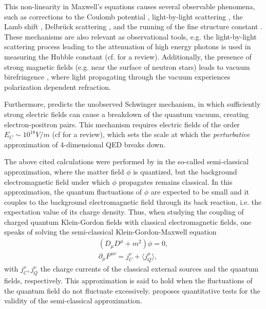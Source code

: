 This non-linearity in Maxwell's equations causes several observable phenomena, such as corrections to the Coulomb potential \cite{Uehl1935, PhysRev.101.843},  light-by-light scattering \cite{Heis1936, ATLAS:2016pab}, 
the Lamb shift \cite{Lamb1947}, Delbrück scattering \cite{Jarl1973, ATLAS:2016pab}, and the running of the fine structure constant \cite{2017485}. These mechanisms are also relevant as observational tools, e.g. the light-by-light scattering process leading to the attenuation of high energy photons is used in measuring the Hubble constant \cite{Domí2019} (cf. \cite{Fran2021} for a review). Additionally, the presence of strong magnetic fields (e.g. near the surface of neutron stars) leads to vacuum birefringence \cite{10.1093/mnras/stw2798}, where light propagating through the vacuum experiences polarization dependent refraction. 

Furthermore, \cite{Schw51} predicts the unobserved Schwinger mechanism, in which sufficiently strong electric fields can cause a breakdown of the quantum vacuum, creating electron-positron pairs.
This mechanism requires electric fields of the order $E_C \sim 10^{18}V/m$ (cf \cite{Dunne2009} for a review), which sets the scale at which the \textit{perturbative} approximation of 4-dimensional QED breaks down. 

The above cited calculations were performed by in the so-called semi-classical approximation, where the matter field $\phi$ is quantized, but the background electromagnetic field under which $\phi$ propagates remains classical. In this approximation, the quantum fluctuations of $\phi$ are expected to be small and it couples to the background electromagnetic field through its back reaction, i.e. the expectation value of its charge density. Thus, when studying the coupling of charged quantum Klein-Gordon fields with classical electromagnetic fields, one speaks of solving the semi-classical Klein-Gordon-Maxwell equation 
\begin{subequations}
\begin{align}
    (D_\mu D^\mu + m^2 ) \phi = 0, \\
    \partial_\mu F^{\mu \nu} = j^\nu_C + \langle j^\mu_Q \rangle,
    \label{eq:maxwell}
\end{align}
\end{subequations}
with $j^\nu_C, j^\nu_Q$ the charge currents of the classical external sources and the quantum fields, respectively.
This approximation is said to hold when the fluctuations of the quantum field do not fluctuate excessively. 
\cite{Anderson_2003} proposes quantitative tests for the validity of the semi-classical approximation.

